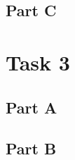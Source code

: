 \documentclass[10pt]{article}
\begin{document}
\subsection*{Part C}

\section*{Task 3}

\subsection*{Part A}

\subsection*{Part B}



\nocite{*}

\end{document}
